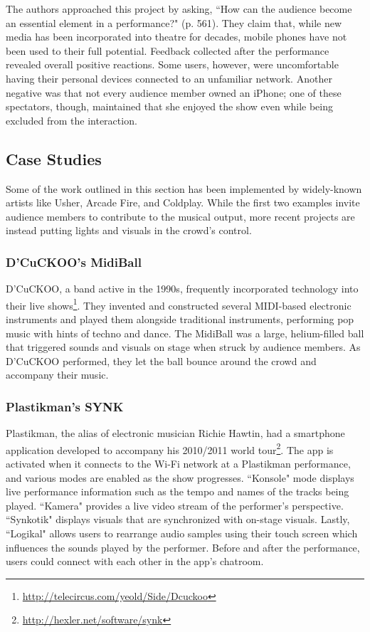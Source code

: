 The authors approached this project by asking, ``How can the audience become an essential element in a performance?" (p. 561). They claim that, while new media has been incorporated into theatre for decades, mobile phones have not been used to their full potential. Feedback collected after the performance revealed overall positive reactions. Some users, however, were uncomfortable having their personal devices connected to an unfamiliar network. Another negative was that not every audience member owned an iPhone; one of these spectators, though, maintained that she enjoyed the show even while being excluded from the interaction.

\subsection{Case Studies}

Some of the work outlined in this section has been implemented by widely-known artists like Usher, Arcade Fire, and Coldplay. While the first two examples invite audience members to contribute to the musical output, more recent projects are instead putting lights and visuals in the crowd's control.

\subsubsection{D'CuCKOO's MidiBall}

D'CuCKOO, a band active in the 1990s, frequently incorporated technology into their live shows\footnote{\url{http://telecircus.com/yeold/Side/Dcuckoo}}. They invented and constructed several MIDI-based electronic instruments and played them alongside traditional instruments, performing pop music with hints of techno and dance. The MidiBall was a large, helium-filled ball that triggered sounds and visuals on stage when struck by audience members. As D'CuCKOO performed, they let the ball bounce around the crowd and accompany their music.

\subsubsection{Plastikman's SYNK}

Plastikman, the alias of electronic musician Richie Hawtin, had a smartphone application developed to accompany his 2010/2011 world tour\footnote{\url{http://hexler.net/software/synk}}. The app is activated when it connects to the Wi-Fi network at a Plastikman performance, and various modes are enabled as the show progresses. ``Konsole" mode displays live performance information such as the tempo and names of the tracks being played. ``Kamera" provides a live video stream of the performer's perspective. ``Synkotik" displays visuals that are synchronized with on-stage visuals. Lastly, ``Logikal" allows users to rearrange audio samples using their touch screen which influences the sounds played by the performer. Before and after the performance, users could connect with each other in the app's chatroom.

